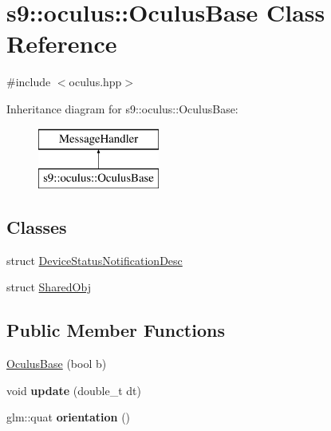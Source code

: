 \hypertarget{classs9_1_1oculus_1_1OculusBase}{\section{s9\-:\-:oculus\-:\-:Oculus\-Base Class Reference}
\label{classs9_1_1oculus_1_1OculusBase}
}


{\ttfamily \#include $<$oculus.\-hpp$>$}

Inheritance diagram for s9\-:\-:oculus\-:\-:Oculus\-Base\-:\begin{figure}[H]
\begin{center}
\leavevmode
\includegraphics[height=2.000000cm]{classs9_1_1oculus_1_1OculusBase}
\end{center}
\end{figure}
\subsection*{Classes}
\begin{DoxyCompactItemize}
\item 
struct \hyperlink{structs9_1_1oculus_1_1OculusBase_1_1DeviceStatusNotificationDesc}{Device\-Status\-Notification\-Desc}
\item 
struct \hyperlink{structs9_1_1oculus_1_1OculusBase_1_1SharedObj}{Shared\-Obj}
\end{DoxyCompactItemize}
\subsection*{Public Member Functions}
\begin{DoxyCompactItemize}
\item 
\hyperlink{classs9_1_1oculus_1_1OculusBase_a574e05f1890877cd2eb77f8fbbd9c553}{Oculus\-Base} (bool b)
\item 
\hypertarget{classs9_1_1oculus_1_1OculusBase_a27692440805e1d7d2703a4e6888d4b80}{void {\bfseries update} (double\-\_\-t dt)}\label{classs9_1_1oculus_1_1OculusBase_a27692440805e1d7d2703a4e6888d4b80}

\item 
\hypertarget{classs9_1_1oculus_1_1OculusBase_aefe5b29e90ed850e13c659afcae4c2b1}{glm\-::quat {\bfseries orientation} ()}\label{classs9_1_1oculus_1_1OculusBase_aefe5b29e90ed850e13c659afcae4c2b1}

\end{DoxyCompactItemize}
